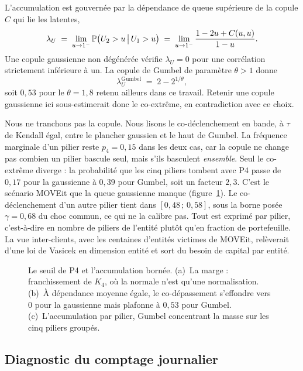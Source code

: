 L'accumulation est gouvernée par la dépendance de queue supérieure de la copule $C$ qui lie les
latentes,
\begin{equation}
  \lambda_U \;=\; \lim_{u\to 1^-}\mathbb{P}\bigl(U_2>u \,\big|\, U_1>u\bigr)
             \;=\; \lim_{u\to 1^-}\frac{1-2u+C(u,u)}{1-u} .
  \label{eq:lambda-U}
\end{equation}
Une copule gaussienne non dégénérée vérifie $\lambda_U=0$ pour une corrélation strictement inférieure à un. La copule de Gumbel de
paramètre $\theta>1$ donne
\begin{equation}
  \lambda_U^{\text{Gumbel}} \;=\; 2-2^{1/\theta},
  \label{eq:lambda-gumbel}
\end{equation}
soit $0{,}53$ pour le $\theta=1{,}8$ retenu ailleurs dans ce travail. Retenir une copule gaussienne
ici sous-estimerait donc le co-extrême, en contradiction avec ce choix.

Nous ne tranchons pas la copule. Nous lisons le co-déclenchement en bande, à $\tau$ de Kendall égal,
entre le plancher gaussien et le haut de Gumbel. La fréquence marginale d'un pilier reste
$p_4=0{,}15$ dans les deux cas, car la copule ne change pas combien un pilier bascule seul, mais s'ils basculent
\emph{ensemble}. Seul le co-extrême diverge : la probabilité que les cinq piliers tombent avec P4 passe
de $0{,}17$ pour la gaussienne à $0{,}39$ pour Gumbel, soit un facteur $2{,}3$. C'est le scénario
MOVEit que la queue gaussienne manque (figure~\ref{fig:p4-seuil}). Le co-déclenchement d'un autre
pilier tient dans $[0{,}48\,;\,0{,}58]$, sous la borne posée $\gamma=0{,}68$ du choc commun, ce qui ne la calibre pas. Tout est exprimé par pilier, c'est-à-dire en nombre de piliers de l'entité plutôt qu'en fraction de
portefeuille. La vue inter-clients, avec les centaines d'entités victimes de MOVEit, relèverait d'une
loi de Vasicek en dimension entité et sort du besoin de capital par entité.

\begin{figure}[H]\centering
{}
\caption{Le seuil de P4 et l'accumulation bornée. (a)~La marge : franchissement de $K_4$, où la
normale n'est qu'une normalisation. (b)~À dépendance moyenne égale, le co-dépassement s'effondre vers
$0$ pour la gaussienne mais plafonne à $0{,}53$ pour Gumbel. (c)~L'accumulation par pilier, Gumbel
concentrant la masse sur les cinq piliers groupés.}
\label{fig:p4-seuil}
\end{figure}

\subsection{Diagnostic du comptage journalier}
\label{sec:p4-comptage}

